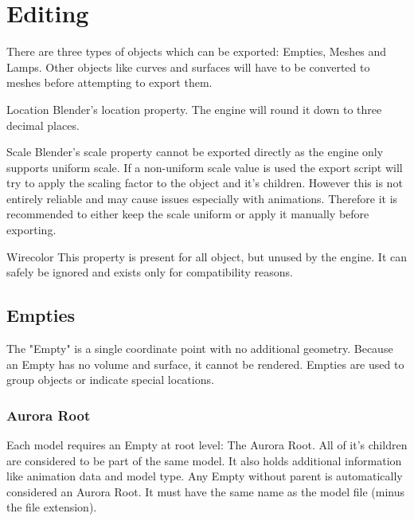\chapter{Editing}
There are three types of objects which can be exported: Empties,
Meshes and Lamps. Other objects like curves and surfaces will have to be
converted to meshes before attempting to export them.

\begin{propertyBlender}{Location}
    Blender's location property. The engine will round it down to three decimal places.
\end{propertyBlender} 

\begin{propertyBlender}{Scale}
    Blender's scale property cannot be exported directly as the engine 
    only supports uniform scale. If a non-uniform scale value is used the export 
    script will try to apply the scaling factor to the object and it's children.
    However this is not entirely reliable and may cause issues especially with 
    animations. Therefore it is recommended to either keep the scale uniform or 
    apply it manually before exporting.
\end{propertyBlender}  

\begin{propertyAurora}{Wirecolor}
    This property is present for all object, but unused by the engine. It can safely be ignored 
    and exists only for compatibility reasons.
\end{propertyAurora}


\section{Empties}
The "Empty" is a single coordinate point with no additional geometry. Because an Empty has 
no volume and surface, it cannot be rendered. Empties are used to group objects or indicate 
special locations.


\subsection{Aurora Root}
Each model requires an Empty at root level: The Aurora Root. All of it's children are 
considered to be part of the same model. It also holds additional information like animation data 
and model type. Any Empty without parent is automatically considered an Aurora Root. 
It must have the same name as the model file (minus the file extension). 

